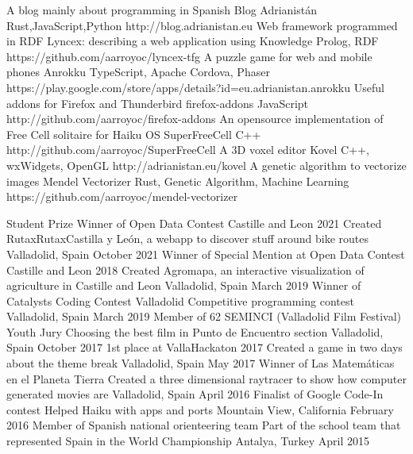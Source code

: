 \documentclass[]{awesome-cv}
\begin{document}
\vspace{-7mm}
\begin{cventries}
	\cventry
	{A blog mainly about programming in Spanish}
	{Blog Adrianistán}
	{Rust,JavaScript,Python}
	{http://blog.adrianistan.eu}
	{}
	\cventry
    {Web framework programmed in RDF}
    {Lyncex: describing a web application using Knowledge}
    {Prolog, RDF}
    {https://github.com/aarroyoc/lyncex-tfg}
    {}
	\cventry
	{A puzzle game for web and mobile phones}
	{Anrokku}
	{TypeScript, Apache Cordova, Phaser}
	{}
	{https://play.google.com/store/apps/details?id=eu.adrianistan.anrokku}
	\cventry
	{Useful addons for Firefox and Thunderbird}
	{firefox-addons}
	{JavaScript}
	{http://github.com/aarroyoc/firefox-addons}
	{}
	\cventry
	{An opensource implementation of Free Cell solitaire for Haiku OS}
	{SuperFreeCell}
	{C++}
	{http://github.com/aarroyoc/SuperFreeCell}
	{}
	\cventry
	{A 3D voxel editor}
	{Kovel}
	{C++, wxWidgets, OpenGL}
	{http://adrianistan.eu/kovel}
	{}
	\cventry
	{A genetic algorithm to vectorize images}
	{Mendel Vectorizer}
	{Rust, Genetic Algorithm, Machine Learning}
	{https://github.com/aarroyoc/mendel-vectorizer}
	{}

	\vspace{-5mm}
\end{cventries}
\begin{cvhonors}
    \cvhonor
	{Student Prize Winner of Open Data Contest Castille and Leon 2021}
	{Created RutaxRutaxCastilla y León, a webapp to discover stuff around bike routes}
	{Valladolid, Spain}
	{October 2021}
	\cvhonor
	{Winner of Special Mention at Open Data Contest Castille and Leon 2018}
	{Created Agromapa, an interactive visualization of agriculture in Castille and Leon}
	{Valladolid, Spain}
	{March 2019}
	\cvhonor
	{Winner of Catalysts Coding Contest Valladolid}
	{Competitive programming contest}
	{Valladolid, Spain}
	{March 2019}
	\cvhonor
	{Member of 62 SEMINCI (Valladolid Film Festival) Youth Jury}
	{Choosing the best film in Punto de Encuentro section}
	{Valladolid, Spain}
	{October 2017}
	\cvhonor
	{1st place at VallaHackaton 2017}
	{Created a game in two days about the theme \textquotedbl{}break\textquotedbl{}}
	{Valladolid, Spain}
	{May 2017}
	\cvhonor
	{Winner of \textquotedbl{}Las Matemáticas en el Planeta Tierra\textquotedbl{}}
	{Created a three dimensional raytracer to show how computer generated movies are}
	{Valladolid, Spain}
	{April 2016}
	\cvhonor
	{Finalist of Google Code-In contest}
	{Helped Haiku with apps and ports}
	{Mountain View, California}
	{February 2016}
	\cvhonor
	{Member of Spanish national orienteering team}
	{Part of the school team that represented Spain in the World Championship}
	{Antalya, Turkey}
	{April 2015}
\end{cvhonors}
\ 
\end{document}
